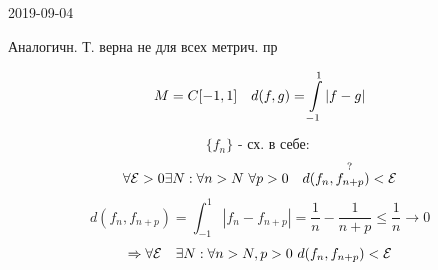 \documentclass[main, 12pt, fleqn]{subfiles}
\begin{document}
\begin{lect} {2019-09-04}
    \begin{remark}
		Аналогичн. Т. верна не для всех метрич. пр
	\end{remark}
	
	\begin{Example}
		\[M = C[-1, 1] \quad d(f, g) = \int\limits_{-1}^1 |f-g|\]
		\begin{figure}[H] %
		\end{figure}
		
		\[\{f_n\} \text{ - сх. в себе: }\]
		\[\forall \E > 0 \e N: \forall n > N \ \forall p > 0 \q \os{?}{d(f_n, f_{n + p}) < \E}\]
		\[d(f_n, f_{n + p}) = \int_{-1}^1 |f_n - f_{n + p}| = \frac{1}{n} - \frac{1}{n + p} \leq \frac{1}{n} \to 0 \]
		\[\Rightarrow \forall \mathcal{E} \quad \exists N: \forall n > N, p > 0 \ d(f_n, f_{n + p}) < \mathcal{E}\]
		\begin{figure}[h]
		\end{figure}
		

\end{Example}
\end{lect}
\end{document}
